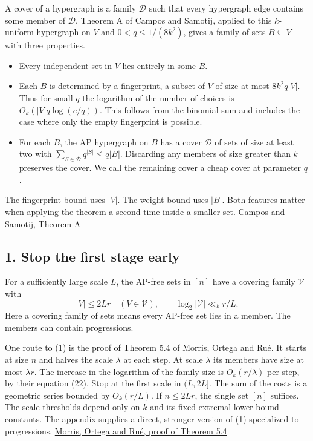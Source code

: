 \documentclass[10pt]{article}
\providecommand{\tightlist}{\setlength{\itemsep}{0pt}\setlength{\parskip}{0pt}}
\begin{document}
A cover of a hypergraph is a family \(\mathcal D\) such that every hypergraph edge contains some member of \(\mathcal D\). Theorem A of Campos and Samotij, applied to this \(k\)-uniform hypergraph on \(V\) and \(0<q\le 1/(8k^2)\), gives a family of sets \(B\subseteq V\) with three properties.

\begin{itemize}
\tightlist
\item
  Every independent set in \(V\) lies entirely in some \(B\).
\item
  Each \(B\) is determined by a fingerprint, a subset of \(V\) of size at most \(8k^2q|V|\). Thus for small \(q\) the logarithm of the number of choices is \(O_k(|V|q\log(e/q))\). This follows from the binomial sum and includes the case where only the empty fingerprint is possible.
\item
  For each \(B\), the AP hypergraph on \(B\) has a cover \(\mathcal D\) of sets of size at least two with \(\sum_{S\in\mathcal D}q^{|S|}\le q|B|\). Discarding any members of size greater than \(k\) preserves the cover. We call the remaining cover a cheap cover at parameter \(q\).
\end{itemize}

The fingerprint bound uses \(|V|\). The weight bound uses \(|B|\). Both features matter when applying the theorem a second time inside a smaller set. \href{https://arxiv.org/abs/2408.06617}{Campos and Samotij, Theorem A}

\subsection{1. Stop the first stage early}\label{stop-the-first-stage-early}

For a sufficiently large scale \(L\), the AP-free sets in \([n]\) have a covering family \(\mathcal V\) with \[
|V|\le 2Lr \quad(V\in\mathcal V),\qquad
\log_2|\mathcal V|\ll_k r/L. \tag{1}
\] Here a covering family of sets means every AP-free set lies in a member. The members can contain progressions.

One route to (1) is the proof of Theorem 5.4 of Morris, Ortega and Rué. It starts at size \(n\) and halves the scale \(\lambda\) at each step. At scale \(\lambda\) its members have size at most \(\lambda r\). The increase in the logarithm of the family size is \(O_k(r/\lambda)\) per step, by their equation (22). Stop at the first scale in \((L,2L]\). The sum of the costs is a geometric series bounded by \(O_k(r/L)\). If \(n\le 2Lr\), the single set \([n]\) suffices. The scale thresholds depend only on \(k\) and its fixed extremal lower-bound constants. The appendix supplies a direct, stronger version of (1) specialized to progressions. \href{https://arxiv.org/abs/2607.17746}{Morris, Ortega and Rué, proof of Theorem 5.4}
\end{document}
